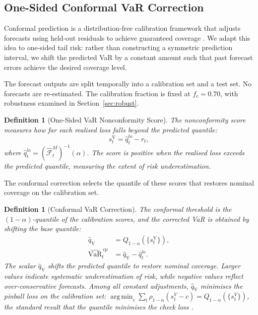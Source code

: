 \documentclass[preprint,11pt,authoryear]{elsarticle}
\DeclareMathOperator*{\argmin}{arg\,min}
\newtheorem{definition}[theorem]{Definition}
\newcommand{\VaR}{\mathrm{VaR}}
\newcommand{\1}{\boldsymbol{1}}
\newcommand{\qV}{\hat{q}_{\scriptscriptstyle\mathrm{V}}}
\newcommand{\Fhat}{\hat{\mathcal{F}}}
\begin{document}
	\subsection{One-Sided Conformal VaR Correction}
	\label{sec:cqr_var}
	
	Conformal prediction is a distribution-free calibration
	framework that adjusts forecasts using held-out residuals to
	achieve guaranteed coverage
	\citep{vovk2005algorithmic, romano2019conformalized}. We
	adapt this idea to one-sided tail risk: rather than
	constructing a symmetric prediction interval, we shift the
	predicted VaR by a constant amount such that past forecast
	errors achieve the desired coverage level.
	
	The forecast outputs are split temporally into a calibration
	set and a test set. No forecasts are re-estimated. The
	calibration fraction is fixed at $f_c = 0.70$, with
	robustness examined in Section~\ref{sec:robust}.
	
	\begin{definition}[One-Sided VaR Nonconformity Score]
		\label{def:var_score}
		The nonconformity score measures how far each realised
		loss falls beyond the predicted quantile:
		\begin{equation}
			s_t^{\mathrm{V}} = \hat{q}_t^{lo} - r_t,
		\end{equation}
		where $\hat{q}_t^{lo} = (\Fhat_t^M)^{-1}(\alpha)$. The
		score is positive when the realised loss exceeds the
		predicted quantile, measuring the extent of risk
		underestimation.
	\end{definition}
	
	The conformal correction selects the quantile of these scores
	that restores nominal coverage on the calibration set.
	
	\begin{definition}[Conformal VaR Correction]
		\label{def:var_correction}
		The conformal threshold is the $(1-\alpha)$-quantile of
		the calibration scores, and the corrected VaR is obtained
		by shifting the base quantile:
		\begin{align}
			\qV &= Q_{1-\alpha}(\{s_t^{\mathrm{V}}\}), \\
			\widehat{\VaR}_t^{\,\mathrm{cp}}
			&= \qV - \hat{q}_t^{lo}.
		\end{align}
		The scalar $\qV$ shifts the predicted quantile to restore
		nominal coverage. Larger values indicate systematic
		underestimation of risk, while negative values reflect
		over-conservative forecasts. Among all constant
		adjustments, $\qV$ minimises the pinball loss on the
		calibration set: $\argmin_c \sum_t
		\rho_{1-\alpha}(s_t^V - c) = Q_{1-\alpha}(\{s_t^V\})$,
		the standard result that the quantile minimises the check
		loss \citep[Theorem~1.1]{koenker2005quantile}.
	\end{definition}
	
\end{document}

